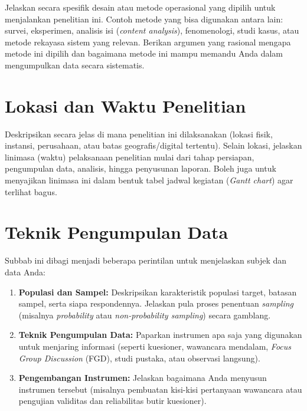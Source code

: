 Jelaskan secara spesifik desain atau metode operasional yang dipilih untuk menjalankan penelitian ini. Contoh metode yang bisa digunakan antara lain: survei, eksperimen, analisis isi (\textit{content analysis}), fenomenologi, studi kasus, atau metode rekayasa sistem yang relevan. Berikan argumen yang rasional mengapa metode ini dipilih dan bagaimana metode ini mampu memandu Anda dalam mengumpulkan data secara sistematis.



\section{Lokasi dan Waktu Penelitian}

Deskripsikan secara jelas di mana penelitian ini dilaksanakan (lokasi fisik, instansi, perusahaan, atau batas geografis/digital tertentu). Selain lokasi, jelaskan linimasa (waktu) pelaksanaan penelitian mulai dari tahap persiapan, pengumpulan data, analisis, hingga penyusunan laporan. Boleh juga untuk menyajikan linimasa ini dalam bentuk tabel jadwal kegiatan (\textit{Gantt chart}) agar terlihat bagus.



%
%
%
\section{Teknik Pengumpulan Data}

Subbab ini dibagi menjadi beberapa perintilan untuk menjelaskan subjek dan data Anda:

\begin{enumerate}
    \item \textbf{Populasi dan Sampel:} Deskripsikan karakteristik populasi target, batasan sampel, serta siapa respondennya. Jelaskan pula proses penentuan \textit{sampling} (misalnya \textit{probability} atau \textit{non-probability sampling}) secara gamblang.
    
    \item \textbf{Teknik Pengumpulan Data:} Paparkan instrumen apa saja yang digunakan untuk menjaring informasi (seperti kuesioner, wawancara mendalam, \textit{Focus Group Discussion} (FGD), studi pustaka, atau observasi langsung).
    
    \item \textbf{Pengembangan Instrumen:} Jelaskan bagaimana Anda menyusun instrumen tersebut (misalnya pembuatan kisi-kisi pertanyaan wawancara atau pengujian validitas dan reliabilitas butir kuesioner).
\end{enumerate}



